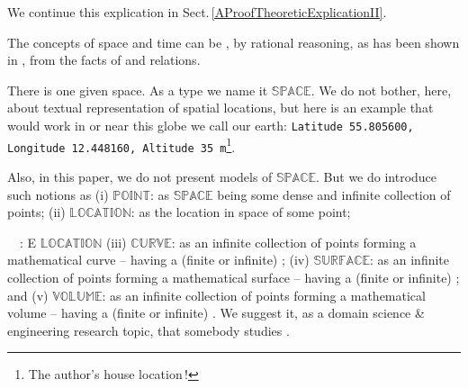 \noindent
\begynd
\pind We continue this explication in Sect.\,\vref{AProofTheoreticExplicationII}.
\afslut

\label{final:Space and Time}

\begynd
\pind The concepts of space and time can be ,
\begynd
\pind by rational reasoning, 
\pind as has been shown in \cite[]{kaisorlander1994,kaisorlander1997,kaisorlander2002,kaisorlander2016,kaisorlander2022}, 
\pind from the facts of  and  relations.
\afslut

\pind {}
\afslut

\label{final:Space}

\begynd
\pind There is one given space.
\pind As a type we name it $\mathbb{SPACE}$.
\pind We do not bother, here, about textual representation of spatial
      locations, 
\pind but here is an example that would work in or near this globe we
      call our earth: 
\pind \texttt{Latitude\,55.805600, Longitude\,12.448160,
  Altitude\,35\,m}\footnote{The author's house location\,!}.
\afslut

\mnewfoil

\begynd
\pind Also, in this paper, we do not present models of $\mathbb{SPACE}$.
\pind But we do introduce such notions as
\begynd
\pind (i)   $\mathbb{POINT}$: as $\mathbb{SPACE}$ being some dense and
            infinite collection of points;
\pind (ii)  $\mathbb{LOCATION}$: as the location in space of some point; 

\bp
{}\ \ \textsf{}: E {\RIGHTARROW} $\mathbb{LOCATION}$
\ep
{}
\pind (iii) $\mathbb{CURVE}$: as an infinite collection of points
            forming a mathematical curve -- having a (finite or
            infinite) ;
\pind (iv)  $\mathbb{SURFACE}$: as an infinite collection of points
            forming a mathematical surface -- having a (finite or
            infinite) ; and
\pind (v)   $\mathbb{VOLUME}$: as an infinite collection of points
            forming a mathematical volume -- having a (finite or
            infinite) .
\afslut
\pind We suggest it, as a domain science \& engineering research topic,
\begynd
\pind that somebody studies .
\afslut
\afslut

